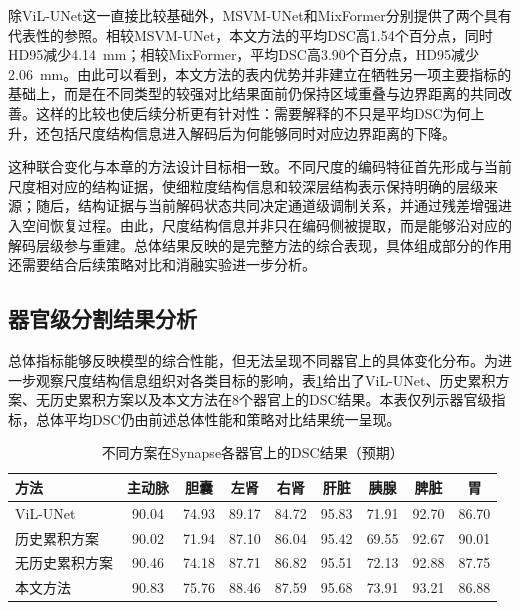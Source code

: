 除ViL-UNet这一直接比较基础外，MSVM-UNet和MixFormer分别提供了两个具有代表性的参照。相较MSVM-UNet，本文方法的平均DSC高1.54个百分点，同时HD95减少4.14~mm；相较MixFormer，平均DSC高3.90个百分点，HD95减少2.06~mm。由此可以看到，本文方法的表内优势并非建立在牺牲另一项主要指标的基础上，而是在不同类型的较强对比结果面前仍保持区域重叠与边界距离的共同改善。这样的比较也使后续分析更有针对性：需要解释的不只是平均DSC为何上升，还包括尺度结构信息进入解码后为何能够同时对应边界距离的下降。

这种联合变化与本章的方法设计目标相一致。不同尺度的编码特征首先形成与当前尺度相对应的结构证据，使细粒度结构信息和较深层结构表示保持明确的层级来源；随后，结构证据与当前解码状态共同决定通道级调制关系，并通过残差增强进入空间恢复过程。由此，尺度结构信息并非只在编码侧被提取，而是能够沿对应的解码层级参与重建。总体结果反映的是完整方法的综合表现，具体组成部分的作用还需要结合后续策略对比和消融实验进一步分析。

\subsection{器官级分割结果分析}

总体指标能够反映模型的综合性能，但无法呈现不同器官上的具体变化分布。为进一步观察尺度结构信息组织对各类目标的影响，表\ref{tab:ch4-organ-comparison}给出了ViL-UNet、历史累积方案、无历史累积方案以及本文方法在8个器官上的DSC结果。本表仅列示器官级指标，总体平均DSC仍由前述总体性能和策略对比结果统一呈现。

\begin{table}[htbp]
  \centering
  \caption{不同方案在Synapse各器官上的DSC结果（预期）}
  \label{tab:ch4-organ-comparison}
  \small
  \setlength{\tabcolsep}{2.7pt}
  \begin{tabular}{lcccccccc}
    \toprule
    方法 & 主动脉 & 胆囊 & 左肾 & 右肾 & 肝脏 & 胰腺 & 脾脏 & 胃 \\
    \midrule
    ViL-UNet & 90.04 & 74.93 & 89.17 & 84.72 & 95.83 & 71.91 & 92.70 & 86.70 \\
    历史累积方案 & 90.02 & 71.94 & 87.10 & 86.04 & 95.42 & 69.55 & 92.67 & 90.01 \\
    无历史累积方案 & 90.46 & 74.18 & 87.71 & 86.82 & 95.51 & 72.13 & 92.88 & 87.75 \\
    本文方法 & 90.83 & 75.76 & 88.46 & 87.59 & 95.68 & 73.91 & 93.21 & 86.88 \\
    \bottomrule
  \end{tabular}
\end{table}

